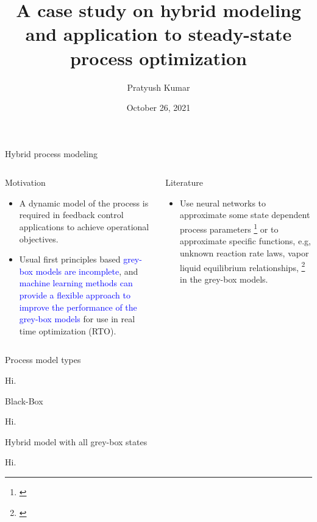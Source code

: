 \documentclass[xcolor=dvipsnames, 8pt]{beamer} %
\title{A case study on hybrid modeling and application to steady-state process 
optimization}
\date{October 26, 2021}
\author[Pratyush Kumar]{\large Pratyush Kumar}
\institute[UCSB]{
	\begin{minipage}{4in}
		\vspace{-10pt}
		\centering
		\raisebox{-0.1\height}{\texttt{[image: UCSB\_seal]}}
	\end{minipage}
	\vspace{10pt}
	\newline
	{\large Department of chemical engineering}
	\vspace{10pt}
	\newline
	{\large Group Meeting Presentation}}
\begin{document}
\frame{\titlepage}



\begin{frame}{Hybrid process modeling}

	\begin{columns}
	\column{\textwidth}

	\begin{block}{Motivation}
		\begin{itemize}
		\item A dynamic model of the process is required in feedback
		control applications to achieve operational objectives. \pause
		\item Usual first principles based \textcolor{blue}{grey-box models are
		incomplete}, and \textcolor{blue}{machine learning methods can provide a
		flexible approach to improve the performance of the grey-box
		models} for use in real time optimization (RTO).
		\end{itemize}
	  \end{block}
	  \pause
	  \bigskip
	\begin{block}{Literature}
	  \begin{itemize}
	  \item Use neural networks to approximate some state dependent process
	  parameters \footnote[frame]{\cite{psichogios:ungar:1992}} or to
	  approximate specific functions, e.g, unknown reaction rate laws, vapor
	  liquid equilibrium relationships,
	  \footnote[frame]{\cite{lovelett:avalos:kevrekidis:2019,
	  chen:ierapetritou:2020, bangi:kwon:2020}} in the grey-box models.	
	  \end{itemize}
	\end{block}
  
\end{columns}
\end{frame}

\begin{frame}{Process model types}

	Hi.

\end{frame}

\begin{frame}{Black-Box}

	Hi.

\end{frame}

\begin{frame}{Hybrid model with all grey-box states}

	Hi.

\end{frame}
\end{document}
